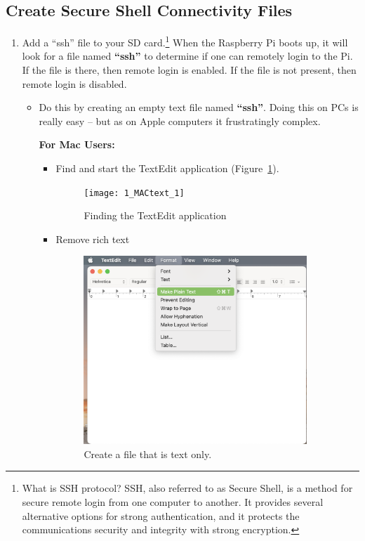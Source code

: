 \documentclass{article}
\begin{document}
\subsection{Create Secure Shell Connectivity Files} \label{networkssh}

\begin{enumerate}
  \item Add a ``ssh'' file to your SD card.\footnote{What is SSH protocol? SSH, also referred to as Secure Shell, is a method for secure remote login from one computer to another. It provides several alternative options for strong authentication, and it protects the communications security and integrity with strong encryption.} When the Raspberry Pi boots up, it will look for a file named \textbf{``ssh''} to determine if one can remotely login to the Pi. If the file is there, then remote login is enabled. If the file is not present, then remote login is disabled. 
  \begin{itemize}
  \item Do this by creating an empty text file named \textbf{``ssh''}. Doing this on PCs is really easy -- but as on Apple computers it frustratingly complex. 
  
\noindent\textbf{For Mac Users:} 

\begin{itemize}
  \item Find and start the TextEdit application (Figure~\ref{fig:Mac1}).
  
\begin{figure}[!h]
\centering
\texttt{[image: 1\_MACtext\_1]}
\caption{Finding the TextEdit application}
\label{fig:Mac1}
\end{figure}

\item Remove rich text

\begin{figure}[h]
\centering
\includegraphics[width=0.9\textwidth]{images/1_TextEdit_PlainText}
\caption{Create a file that is text only.}
\label{fig:Mac2}
\end{figure}




\end{itemize}
\end{itemize}
\end{enumerate}
\end{document}
